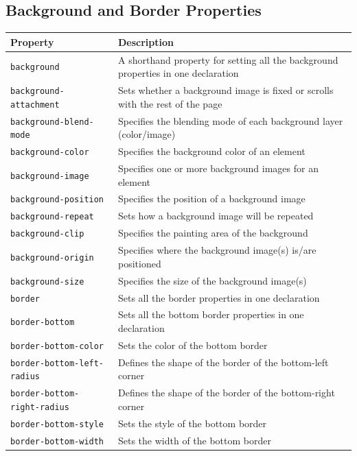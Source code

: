 \documentclass[11pt, letterpaper]{article}
\begin{document}
		\subsection{Background and Border Properties}
			\begin{longtable}{p{5cm} p{10cm}}
				\toprule
				Property & Description \\\midrule 
				\texttt{background} & A shorthand property for setting all the background properties in one declaration \\\midrule
				\texttt{background-attachment} & Sets whether a background image is fixed or scrolls with the rest of the page \\\midrule
				\texttt{background-blend-mode} & Specifies the blending mode of each background layer (color/image) \\\midrule 
				\texttt{background-color} & Specifies the background color of an element \\\midrule
				\texttt{background-image} & Specifies one or more background images for an element \\\midrule
				\texttt{background-position} & Specifies the position of a background image \\\midrule
				\texttt{background-repeat} & Sets how a background image will be repeated \\\midrule
				\texttt{background-clip} & Specifies the painting area of the background \\\midrule
				\texttt{background-origin} & Specifies where the background image(s) is/are positioned \\\midrule
				\texttt{background-size} & Specifies the size of the background image(s) \\\midrule
				\texttt{border} & Sets all the border properties in one declaration \\\midrule
				\texttt{border-bottom} & Sets all the bottom border properties in one declaration \\\midrule
				\texttt{border-bottom-color} & Sets the color of the bottom border \\\midrule 
				\texttt{border-bottom-left-radius} & Defines the shape of the border of the bottom-left corner \\\midrule
				\texttt{border-bottom-right-radius} & Defines the shape of the border of the bottom-right corner \\\midrule
				\texttt{border-bottom-style} & Sets the style of the bottom border \\\midrule
				\texttt{border-bottom-width} & Sets the width of the bottom border \\\midrule

\end{longtable}
\end{document}
